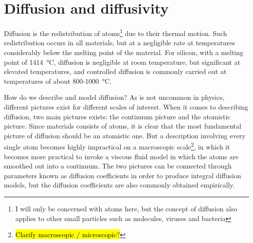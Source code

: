 \documentclass[11pt,bibliography=totoc,index=totoc]{scrbook}   %
\newcommand{\comment}[1]{\hl{#1}}
\begin{document}







\section{Diffusion and diffusivity}

Diffusion is the redistribution of atoms\footnote{I will only be concerned with atoms here, but the concept of diffusion also applies to other small particles such as molecules, viruses and bacteria} due to their thermal motion. 
Such redistribution occurs in all materials, but at a negligible rate at temperatures considerably below the melting point of the material.
For silicon, with a melting point of \SI{1414}{\celsius}, diffusion is negligible at room temperature, 
but significant at elevated temperatures, and controlled diffusion is commonly carried out at temperatures 
of about 800-\SI{1000}{\celsius}. 

How do we describe and model diffusion?
As is not uncommon in physics, different pictures exist for different scales of interest. 
When it comes to describing diffusion, two main pictures exists: the continuum picture and the atomistic picture. 
Since materials consists of atoms, it is clear that the most fundamental picture of diffusion should be an atomistic one.
But a description involving every single atom becomes highly impractical on a macroscopic scale\footnote{\comment{Clarify macroscopic / microscopic?}
}, in which it becomes more practical to invoke a viscous fluid model in which the atoms are smoothed out into a continuum.
The two pictures can be connected through parameters known as diffusion coefficients in order to produce integral diffusion models,
but the diffusion coefficients are also commonly obtained empirically.
\end{document}

